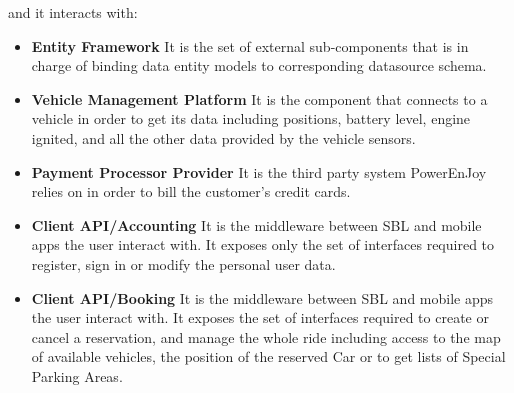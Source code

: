 and it interacts with:
\begin{itemize}
    \item\textbf{Entity Framework}\newline
    It is the set of external sub-components that is in charge of binding data entity models to corresponding datasource schema.
    \item\textbf{Vehicle Management Platform}\newline
    It is the component that connects to a vehicle in order to get its data including positions, battery level, engine ignited, and all the other data provided by the vehicle sensors.
    \item\textbf{Payment Processor Provider}\newline
    It is the third party system PowerEnJoy relies on in order to bill the customer's credit cards.
    \item\textbf{Client API/Accounting}\newline
    It is the middleware between SBL and mobile apps the user interact with. It exposes only the set of interfaces required to register, sign in or modify the personal user data.
    \item\textbf{Client API/Booking}\newline
    It is the middleware between SBL and mobile apps the user interact with. It exposes the set of interfaces required to create or cancel a reservation, and manage the whole ride including access to the map of available vehicles, the position of the reserved Car or to get lists of Special Parking Areas.
\end{itemize}
\newpage

